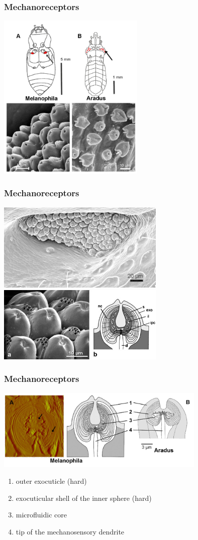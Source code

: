 \documentclass[14pt]{beamer}
\begin{document}
\begin{frame}
\frametitle{Mechanoreceptors}
\includegraphics[width=7cm]{beetles_sensors.png}
\end{frame}
\begin{frame}
\frametitle{Mechanoreceptors}
\includegraphics[width=8cm]{6974e8e62f.jpg}\\
\includegraphics[width=8cm]{IR_sensor_abb_3_02.jpg}
\end{frame}
\begin{frame}
\frametitle{Mechanoreceptors}
\includegraphics[width=10cm]{mechanoreceptor.png}
\begin{enumerate}
\item outer exocuticle (hard)
\item exocuticular shell of the inner sphere (hard)
\item microfluidic core
\item tip of the mechanosensory dendrite
\end{enumerate}
\end{frame}
\end{document}
